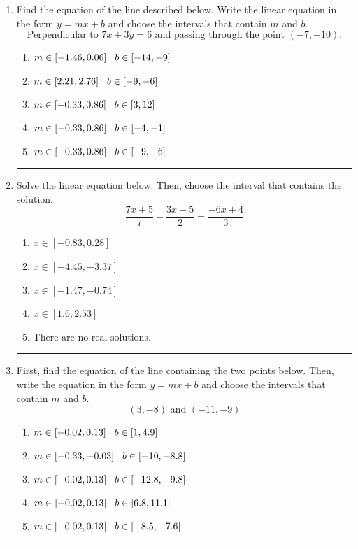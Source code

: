 \documentclass[14pt]{extbook}
\newcommand{\litem}[1]{\item#1\hspace*{-1cm}\rule{\textwidth}{0.4pt}}
\begin{document}
\begin{enumerate}
{\begin{enumerate}[label=\Alph*.]
\end{enumerate} }
\litem{
Find the equation of the line described below. Write the linear equation in the form $ y=mx+b $ and choose the intervals that contain $m$ and $b$.\[ \text{Perpendicular to } 7 x + 3 y = 6 \text{ and passing through the point } (-7, -10). \]\begin{enumerate}[label=\Alph*.]
\item \( m \in [-1.46, 0.06] \hspace*{3mm} b \in [-14, -9] \)
\item \( m \in [2.21, 2.76] \hspace*{3mm} b \in [-9, -6] \)
\item \( m \in [-0.33, 0.86] \hspace*{3mm} b \in [3, 12] \)
\item \( m \in [-0.33, 0.86] \hspace*{3mm} b \in [-4, -1] \)
\item \( m \in [-0.33, 0.86] \hspace*{3mm} b \in [-9, -6] \)

\end{enumerate} }
\litem{
Solve the linear equation below. Then, choose the interval that contains the solution.\[ \frac{7x + 5}{7} - \frac{3x -5}{2} = \frac{-6x + 4}{3} \]\begin{enumerate}[label=\Alph*.]
\item \( x \in [-0.83, 0.28] \)
\item \( x \in [-4.45, -3.37] \)
\item \( x \in [-1.47, -0.74] \)
\item \( x \in [1.6, 2.53] \)
\item \( \text{There are no real solutions.} \)

\end{enumerate} }
\litem{
First, find the equation of the line containing the two points below. Then, write the equation in the form $ y=mx+b $ and choose the intervals that contain $m$ and $b$.\[ (3, -8) \text{ and } (-11, -9) \]\begin{enumerate}[label=\Alph*.]
\item \( m \in [-0.02, 0.13] \hspace*{3mm} b \in [1, 4.9] \)
\item \( m \in [-0.33, -0.03] \hspace*{3mm} b \in [-10, -8.8] \)
\item \( m \in [-0.02, 0.13] \hspace*{3mm} b \in [-12.8, -9.8] \)
\item \( m \in [-0.02, 0.13] \hspace*{3mm} b \in [6.8, 11.1] \)
\item \( m \in [-0.02, 0.13] \hspace*{3mm} b \in [-8.5, -7.6] \)


\end{enumerate}}
\end{enumerate}
\end{document}
